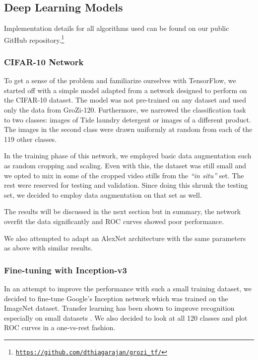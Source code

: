 \documentclass[letterpaper, 11pt]{article}
\begin{document}
\subsection{Deep Learning Models}

\noindent Implementation details for all algorithms used can be found on our public GitHub repository.\footnote{\texttt{\href{https://github.com/dthiagarajan/grozi_tf/}{https://github.com/dthiagarajan/grozi\_tf/}}}

\subsubsection{CIFAR-10 Network}

To get a sense of the problem and familiarize ourselves with TensorFlow, we started off with a simple model adapted from a network designed to perform on the CIFAR-10 dataset. The model was not pre-trained on any dataset and used only the data from GroZi-120. Furthermore, we narrowed the classification task to two classes: images of Tide laundry detergent or images of a different product. The images in the second class were drawn uniformly at random from each of the 119 other classes.

In the training phase of this network, we employed basic data augmentation such as random cropping and scaling. Even with this, the dataset was still small and we opted to mix in some of the cropped video stills from the \textit{``in situ''} set. The rest were reserved for testing and validation. Since doing this shrunk the testing set, we decided to employ data augmentation on that set as well.

The results will be discussed in the next section but in summary, the network overfit the data significantly and ROC curves showed poor performance.

We also attempted to adapt an AlexNet architecture with the same parameters as above with similar results.

\subsubsection{Fine-tuning with Inception-v3}

In an attempt to improve the performance with such a small training dataset, we decided to fine-tune Google's Inception network which was trained on the ImageNet dataset. Transfer learning has been shown to improve recognition especially on small datasets \cite{donahue13}. We also decided to look at all 120 classes and plot ROC curves in a one-vs-rest fashion.
\end{document}
